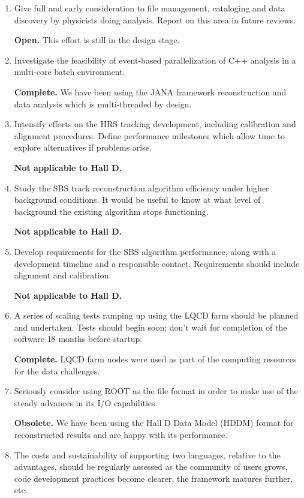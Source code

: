 \documentclass[12pt]{article}
\begin{document}
\begin{enumerate}
\item Give full and early consideration to file management, cataloging
  and data discovery by physicists doing analysis. Report on this area
  in future reviews.

  {\bf Open.} This effort is still in the design stage.

\item Investigate the feasibility of event-based parallelization of
  C++ analysis in a multi-core batch environment.

  {\bf Complete.} We have been using the JANA framework reconstruction
  and data analysis which is multi-threaded by design.

\item Intensify efforts on the HRS tracking development, including
  calibration and alignment procedures. Define performance milestones
  which allow time to explore alternatives if problems arise.

  {\bf Not applicable to Hall D.}

\item Study the SBS track reconstruction algorithm efficiency under
  higher background conditions. It would be useful to know at what
  level of background the existing algorithm stops functioning.

  {\bf Not applicable to Hall D.}

\item Develop requirements for the SBS algorithm performance, along
  with a development timeline and a responsible contact. Requirements
  should include alignment and calibration.

  {\bf Not applicable to Hall D.}

\item A series of scaling tests ramping up using the LQCD farm should
  be planned and undertaken. Tests should begin soon; don't wait for
  completion of the software 18 months before startup.

  {\bf Complete.} LQCD farm nodes were used as part of the computing
  resources for the data challenges.

\item Seriously consider using ROOT as the file format in order to
  make use of the steady advances in its I/O capabilities.

  {\bf Obsolete.} We have been using the Hall D Data Model (HDDM)
  format for reconstructed results and are happy with its performance.

\item The costs and sustainability of supporting two languages,
  relative to the advantages, should be regularly assessed as the
  community of users grows, code development practices become clearer,
  the framework matures further, etc.


\end{enumerate}
\end{document}
